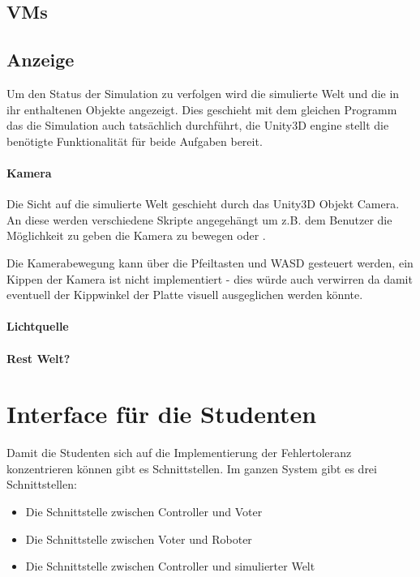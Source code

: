 \documentclass[
    12pt,
    bibliography=totoc,
    ngerman
]{scrartcl}
\begin{document}
\subsection{VMs}

\subsection{Anzeige}\label{graphics}
Um den Status der Simulation zu verfolgen wird die simulierte Welt und die in ihr enthaltenen Objekte angezeigt. Dies geschieht mit dem gleichen Programm das die Simulation auch tats{\"{a}}chlich
durchf{\"{u}}hrt, die Unity3D engine stellt die ben{\"{o}}tigte Funktionalit{\"{a}}t f{\"{u}}r beide Aufgaben bereit.

\paragraph{Kamera} Die Sicht auf die simulierte Welt geschieht durch das Unity3D Objekt Camera. An diese werden verschiedene Skripte angegeh{\"{a}}ngt um z.B. dem Benutzer die M{\"{o}}glichkeit zu
geben die Kamera zu bewegen oder .

Die Kamerabewegung kann {\"{u}}ber die Pfeiltasten und WASD gesteuert werden, ein Kippen der Kamera ist nicht implementiert - dies w{\"{u}}rde auch verwirren da damit eventuell der Kippwinkel der
Platte visuell ausgeglichen werden k{\"{o}}nnte.

\paragraph{Lichtquelle}

\paragraph{Rest Welt?}

\clearpage
\section{Interface f{\"{u}}r die Studenten}\label{interface}
Damit die Studenten sich auf die Implementierung der Fehlertoleranz konzentrieren k{\"{o}}nnen gibt es Schnittstellen.
Im ganzen System gibt es drei Schnittstellen:
\begin{itemize}
\item Die Schnittstelle zwischen Controller und Voter
\item Die Schnittstelle zwischen Voter und Roboter
\item Die Schnittstelle zwischen Controller und simulierter Welt 
\end{itemize}
\end{document}
